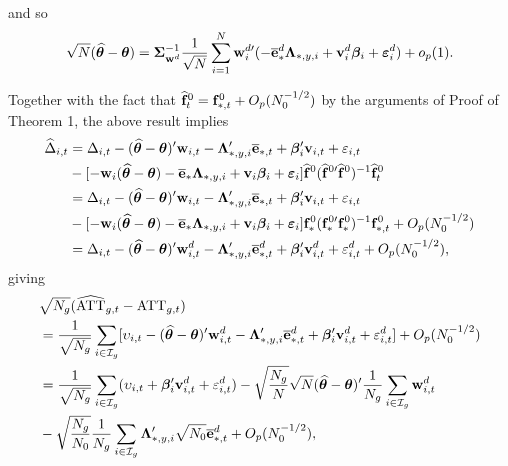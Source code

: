 \documentclass[12pt,fleqn]{article}
\begin{document}
and so
\begin{align}
\sqrt{N}(\widehat{\boldsymbol{\theta}} - \boldsymbol{\theta}) = \boldsymbol{\Sigma}_{\mathbf{w}^d}^{-1}\frac{1}{\sqrt{N}}\sum_{i=1}^N \mathbf{w}_{i}^{d\prime} (-\overline{\mathbf{e}}_{*}^d\boldsymbol{\Lambda}_{*,y,i}  + \mathbf{v}_i^d\boldsymbol{\beta}_i +  \boldsymbol{\varepsilon}_{i}^d) +  o_p(1).
\end{align}

Together with the fact that $\widehat{\mathbf{f}}_{t}^0 = \mathbf{f}_{*,t}^0 + O_p(N_0^{-1/2})$ by the arguments of Proof of Theorem 1, the above result implies
\begin{align}
\widehat \Delta_{i,t} & = \Delta_{i,t} - (\widehat{\boldsymbol{\theta}} - \boldsymbol{\theta})'\mathbf{w}_{i,t} - \boldsymbol{\Lambda}_{*,y,i}'\overline{\mathbf{e}}_{*,t}  + \boldsymbol{\beta}_i' \mathbf{v}_{i,t} + \varepsilon_{i,t} \notag\\
& - [ -\mathbf{w}_{i}(\widehat{\boldsymbol{\theta}} - \boldsymbol{\theta}) - \overline{\mathbf{e}}_{*}\boldsymbol{\Lambda}_{*,y,i} + \mathbf{v}_i\boldsymbol{\beta}_i  + \boldsymbol{\varepsilon}_{i} ] \widehat{\mathbf{f}}^{0}(\widehat{\mathbf{f}}^{0\prime}\widehat{\mathbf{f}}^0)^{-1}\widehat{\mathbf{f}}_{t}^0 \notag\\
& = \Delta_{i,t} - (\widehat{\boldsymbol{\theta}} - \boldsymbol{\theta})'\mathbf{w}_{i,t} - \boldsymbol{\Lambda}_{*,y,i}'\overline{\mathbf{e}}_{*,t}  + \boldsymbol{\beta}_i' \mathbf{v}_{i,t} + \varepsilon_{i,t} \notag\\
& - [ -\mathbf{w}_{i}(\widehat{\boldsymbol{\theta}} - \boldsymbol{\theta}) - \overline{\mathbf{e}}_{*}\boldsymbol{\Lambda}_{*,y,i} + \mathbf{v}_i\boldsymbol{\beta}_i  + \boldsymbol{\varepsilon}_{i} ] \mathbf{f}_*^{0}(\mathbf{f}_*^{0\prime}\mathbf{f}_*^0)^{-1}\mathbf{f}_{*,t}^0 +  O_p(N_0^{-1/2})\notag\\
& = \Delta_{i,t} - (\widehat{\boldsymbol{\theta}} - \boldsymbol{\theta})'\mathbf{w}_{i,t}^d - \boldsymbol{\Lambda}_{*,y,i}'\overline{\mathbf{e}}_{*,t}^d  + \boldsymbol{\beta}_i' \mathbf{v}_{i,t}^d + \varepsilon_{i,t}^d  +  O_p(N_0^{-1/2}),
\end{align}
giving
\begin{align}
& \sqrt{N_g}(\widehat{\mathrm{ATT}}_{g,t} - \mathrm{ATT}_{g,t}) \notag\\
& = \frac{1}{\sqrt{N_g}} \sum_{i\in \mathcal{I}_g} [\upsilon_{i,t} - (\widehat{\boldsymbol{\theta}} - \boldsymbol{\theta})'\mathbf{w}_{i,t}^d - \boldsymbol{\Lambda}_{*,y,i}'\overline{\mathbf{e}}_{*,t}^d  + \boldsymbol{\beta}_i' \mathbf{v}_{i,t}^d + \varepsilon_{i,t}^d ] + O_p(N_0^{-1/2})\notag\\
&= \frac{1}{\sqrt{N_g}}\sum_{i\in \mathcal{I}_g}(\upsilon_{i,t}  + \boldsymbol{\beta}_i'\mathbf{v}_{i,t}^d + \varepsilon_{i,t}^d)  - \sqrt{\frac{N_g}{N}} \sqrt{N}(\widehat{\boldsymbol{\theta}} - \boldsymbol{\theta})'\frac{1}{N_g}\sum_{i\in \mathcal{I}_g} \mathbf{w}_{i,t}^{d} \notag\\
& - \sqrt{\frac{N_g}{N_0}} \frac{1}{N_g}\sum_{i\in \mathcal{I}_g} \boldsymbol{\Lambda}_{*,y,i}'\sqrt{N_0}\overline{\mathbf{e}}_{*,t}^{d} + O_p(N_0^{-1/2}) ,
\end{align}
\end{document}
